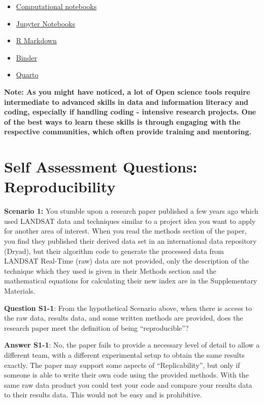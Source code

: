 \documentclass[
  letterpaper,
  DIV=11,
  numbers=noendperiod]{scrreport}
\providecommand{\tightlist}{%
  \setlength{\itemsep}{0pt}\setlength{\parskip}{0pt}}\usepackage{longtable,booktabs,array}
\begin{document}
\begin{itemize}
\tightlist
\item
  \href{https://www.lancaster.ac.uk/data-science-of-the-natural-environment/blogs/computational-notebooks-for-open-science}{Computational
  notebooks}
\item
  \href{https://jupyter.org/}{Jupyter Notebooks}
\item
  \href{https://rmarkdown.rstudio.com/}{R Markdown}
\item
  \href{https://mybinder.org/}{Binder}
\item
  \href{https://quarto.org/}{Quarto}
\end{itemize}

\textbf{Note: As you might have noticed, a lot of Open science tools
require intermediate to advanced skills in data and information literacy
and coding, especially if handling coding - intensive research projects.
One of the best ways to learn these skills is through engaging with the
respective communities, which often provide training and mentoring.}

\hypertarget{self-assessment-questions-reproducibility}{%
\section{Self Assessment Questions:
Reproducibility}\label{self-assessment-questions-reproducibility}}

\textbf{Scenario 1:} You stumble upon a research paper published a few
years ago which used LANDSAT data and techniques similar to a project
idea you want to apply for another area of interest. When you read the
methods section of the paper, you find they published their derived data
set in an international data repository (Dryad), but their algorithm
code to generate the processed data from LANDSAT Real-Time (raw) data
are not provided, only the description of the technique which they used
is given in their Methods section and the mathematical equations for
calculating their new index are in the Supplementary Materials.

\textbf{Question S1-1}: From the hypothetical Scenario above, when there
is access to the raw data, results data, and some written methods are
provided, does the research paper meet the definition of being
``reproducible''?

\textbf{Answer S1-1}: No, the paper fails to provide a necessary level
of detail to allow a different team, with a different experimental setup
to obtain the same results exactly. The paper may support some aspects
of ``Replicability'', but only if someone is able to write their own
code using the provided methods. With the same raw data product you
could test your code and compare your results data to their results
data. This would not be easy and is prohibitive.
\end{document}
